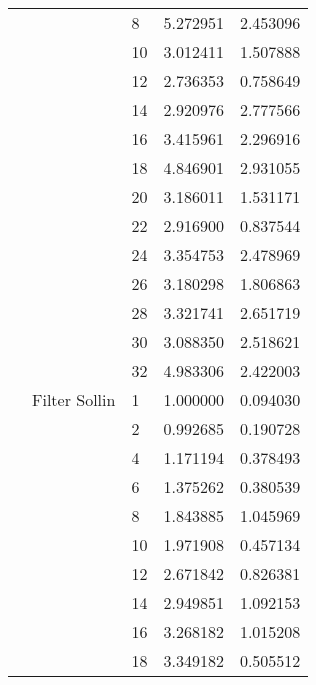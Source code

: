 \begin{tabular}{lllrr}
                      &                     & 8  &  5.272951 &  2.453096 \\
                      &                     & 10 &  3.012411 &  1.507888 \\
                      &                     & 12 &  2.736353 &  0.758649 \\
                      &                     & 14 &  2.920976 &  2.777566 \\
                      &                     & 16 &  3.415961 &  2.296916 \\
                      &                     & 18 &  4.846901 &  2.931055 \\
                      &                     & 20 &  3.186011 &  1.531171 \\
                      &                     & 22 &  2.916900 &  0.837544 \\
                      &                     & 24 &  3.354753 &  2.478969 \\
                      &                     & 26 &  3.180298 &  1.806863 \\
                      &                     & 28 &  3.321741 &  2.651719 \\
                      &                     & 30 &  3.088350 &  2.518621 \\
                      &                     & 32 &  4.983306 &  2.422003 \\
                      & Filter Sollin & 1  &  1.000000 &  0.094030 \\
                      &                     & 2  &  0.992685 &  0.190728 \\
                      &                     & 4  &  1.171194 &  0.378493 \\
                      &                     & 6  &  1.375262 &  0.380539 \\
                      &                     & 8  &  1.843885 &  1.045969 \\
                      &                     & 10 &  1.971908 &  0.457134 \\
                      &                     & 12 &  2.671842 &  0.826381 \\
                      &                     & 14 &  2.949851 &  1.092153 \\
                      &                     & 16 &  3.268182 &  1.015208 \\
                      &                     & 18 &  3.349182 &  0.505512 \\

\end{tabular}
